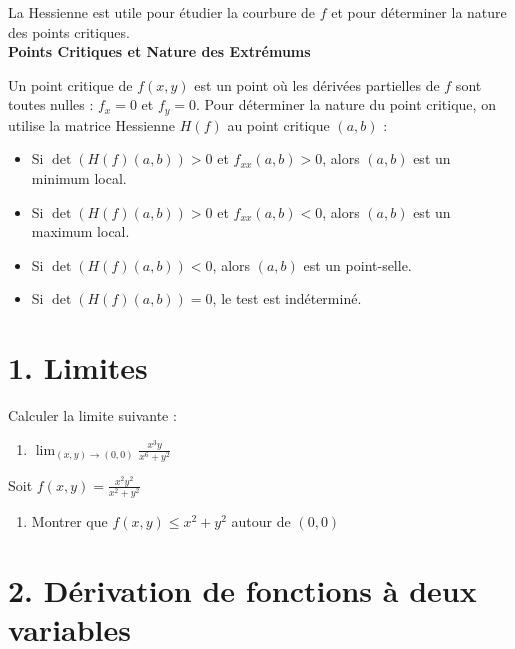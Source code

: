 La Hessienne est utile pour étudier la courbure de \( f \) et pour déterminer la nature des points critiques. \\

\textbf{Points Critiques et Nature des Extrémums}

Un point critique de \( f(x, y) \) est un point où les dérivées partielles de \( f \) sont toutes nulles : \( f_x = 0 \) et \( f_y = 0 \). Pour déterminer la nature du point critique, on utilise la matrice Hessienne \( H(f) \) au point critique \((a, b)\) :
\begin{itemize}
    \item Si \( \det(H(f)(a, b)) > 0 \) et \( f_{xx}(a, b) > 0 \), alors \((a, b)\) est un minimum local.
    \item Si \( \det(H(f)(a, b)) > 0 \) et \( f_{xx}(a, b) < 0 \), alors \((a, b)\) est un maximum local.
    \item Si \( \det(H(f)(a, b)) < 0 \), alors \((a, b)\) est un point-selle.
    \item Si \( \det(H(f)(a, b)) = 0 \), le test est indéterminé. 
\end{itemize}


\section*{1. Limites}

\begin{exercise}
    Calculer la limite suivante : 
    \begin{enumerate}[label=(\alph*)]
        \item $\displaystyle\lim_{(x,y)\to(0,0)}\frac{x^3y}{x^6+y^2}$
    \end{enumerate}
\end{exercise}

\begin{exercise}
   Soit $f(x,y)=\frac{x^2y^2}{x^2+y^2}$
    \begin{enumerate}[label=(\alph*)]
        \item Montrer que $f(x,y)\leq x^2+y^2$ autour de $(0,0)$
    \end{enumerate}
\end{exercise}

\section*{2. Dérivation de fonctions à deux variables}

